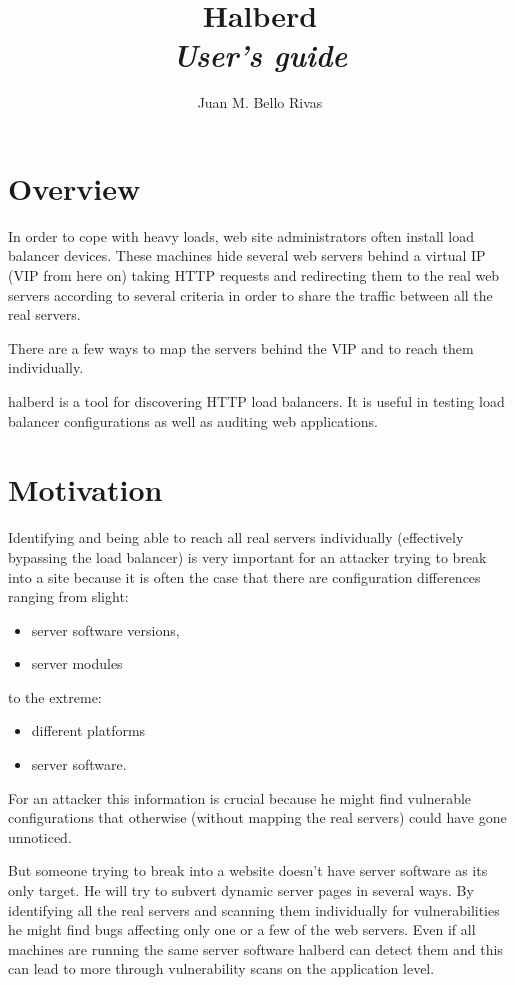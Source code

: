 \documentclass[a4paper]{book}
\begin{document}
\title{Halberd\\{\Large \it User's guide}}
\author{Juan M. Bello Rivas}
\maketitle

\tableofcontents

\chapter{Overview}

In order to cope with heavy loads, web site administrators often install load
balancer devices.  These machines hide several web servers behind a virtual IP
(VIP from here on) taking HTTP requests and redirecting them to the real web
servers according to several criteria in order to share the traffic between all
the real servers.

There are a few ways to map the servers behind the VIP and to reach them
individually.

halberd is a tool for discovering HTTP load balancers. It is useful in testing
load balancer configurations as well as auditing web applications.

\chapter{Motivation}

Identifying and being able to reach all real servers individually (effectively
bypassing the load balancer) is very important for an attacker trying to break
into a site because it is often the case that there are configuration
differences ranging from slight:

\begin{itemize}
  \item server software versions,
  \item server modules
\end{itemize}

to the extreme:

\begin{itemize}
  \item different platforms
  \item server software.
\end{itemize}

For an attacker this information is crucial because he might find vulnerable
configurations that otherwise (without mapping the real servers) could have
gone unnoticed.

But someone trying to break into a website doesn't have server software as its
only target. He will try to subvert dynamic server pages in several ways.  By
identifying all the real servers and scanning them individually for
vulnerabilities he might find bugs affecting only one or a few of the web
servers. Even if all machines are running the same server software halberd can
detect them and this can lead to more through vulnerability scans on the
application level.
\end{document}
